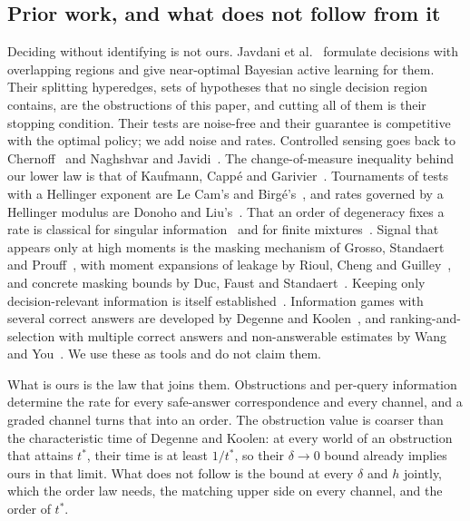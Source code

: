 \subsection{Prior work, and what does not follow from it}

Deciding without identifying is not ours. Javdani et al.~\cite{javdani2014} formulate decisions
with overlapping regions and give near-optimal Bayesian active learning for them. Their
splitting hyperedges, sets of hypotheses that no single decision region contains, are the
obstructions of this paper, and cutting all of them is their stopping condition. Their tests are
noise-free and their guarantee is competitive with the optimal policy; we add noise and rates.
Controlled sensing goes back to Chernoff~\cite{chernoff1959} and Naghshvar and
Javidi~\cite{naghshvar2013}. The change-of-measure inequality behind our lower law is that of
Kaufmann, Capp\'e and Garivier~\cite{kaufmann2016}. Tournaments of tests with a Hellinger
exponent are Le Cam's and Birg\'e's~\cite{lecam1973,birge1983}, and rates governed by a Hellinger
modulus are Donoho and Liu's~\cite{donoho1991}. That an order of degeneracy fixes a rate is
classical for singular information~\cite{rotnitzky2000} and for finite
mixtures~\cite{heinrich2018,honguyen2015}. Signal that
appears only at high moments is the masking mechanism of Grosso, Standaert and
Prouff~\cite{grosso2014}, with moment expansions of leakage by Rioul, Cheng and
Guilley~\cite{rioul2021}, and concrete masking bounds by Duc, Faust and Standaert~\cite{duc2015}.
Keeping only decision-relevant information is itself established~\cite{poli2023}. Information
games with several correct answers are developed by Degenne and Koolen~\cite{degenne2019}, and
ranking-and-selection with multiple correct answers and non-answerable estimates by Wang and
You~\cite{wangyou2026}. We use these as tools and do not claim them.

What is ours is the law that joins them. Obstructions and per-query information determine the
rate for every safe-answer correspondence and every channel, and a graded channel turns that
into an order. The obstruction value is coarser than the characteristic time of Degenne and
Koolen: at every world of an obstruction that attains $t^{*}$, their time is at least $1/t^{*}$,
so their $\delta\to0$ bound already implies ours in that limit. What does not follow is the
bound at every $\delta$ and $h$ jointly, which the order law needs, the matching upper side on
every channel, and the order of $t^{*}$.

